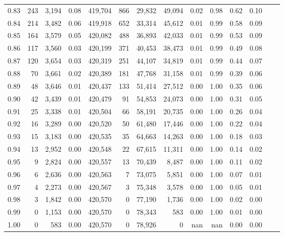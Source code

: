 \begin{tabular}{rrrrrrrrrrrrrr}
0.83 &    243 &  3,194 &     0.08 &  419,704 &      866 &  29,832 &  49,094 &  0.02 &  0.98 &  0.62 &      0.10 \\
0.84 &    214 &  3,482 &     0.06 &  419,918 &      652 &  33,314 &  45,612 &  0.01 &  0.99 &  0.58 &      0.09 \\
0.85 &    164 &  3,579 &     0.05 &  420,082 &      488 &  36,893 &  42,033 &  0.01 &  0.99 &  0.53 &      0.09 \\
0.86 &    117 &  3,560 &     0.03 &  420,199 &      371 &  40,453 &  38,473 &  0.01 &  0.99 &  0.49 &      0.08 \\
0.87 &    120 &  3,654 &     0.03 &  420,319 &      251 &  44,107 &  34,819 &  0.01 &  0.99 &  0.44 &      0.07 \\
0.88 &     70 &  3,661 &     0.02 &  420,389 &      181 &  47,768 &  31,158 &  0.01 &  0.99 &  0.39 &      0.06 \\
0.89 &     48 &  3,646 &     0.01 &  420,437 &      133 &  51,414 &  27,512 &  0.00 &  1.00 &  0.35 &      0.06 \\
0.90 &     42 &  3,439 &     0.01 &  420,479 &       91 &  54,853 &  24,073 &  0.00 &  1.00 &  0.31 &      0.05 \\
0.91 &     25 &  3,338 &     0.01 &  420,504 &       66 &  58,191 &  20,735 &  0.00 &  1.00 &  0.26 &      0.04 \\
0.92 &     16 &  3,289 &     0.00 &  420,520 &       50 &  61,480 &  17,446 &  0.00 &  1.00 &  0.22 &      0.04 \\
0.93 &     15 &  3,183 &     0.00 &  420,535 &       35 &  64,663 &  14,263 &  0.00 &  1.00 &  0.18 &      0.03 \\
0.94 &     13 &  2,952 &     0.00 &  420,548 &       22 &  67,615 &  11,311 &  0.00 &  1.00 &  0.14 &      0.02 \\
0.95 &      9 &  2,824 &     0.00 &  420,557 &       13 &  70,439 &   8,487 &  0.00 &  1.00 &  0.11 &      0.02 \\
0.96 &      6 &  2,636 &     0.00 &  420,563 &        7 &  73,075 &   5,851 &  0.00 &  1.00 &  0.07 &      0.01 \\
0.97 &      4 &  2,273 &     0.00 &  420,567 &        3 &  75,348 &   3,578 &  0.00 &  1.00 &  0.05 &      0.01 \\
0.98 &      3 &  1,842 &     0.00 &  420,570 &        0 &  77,190 &   1,736 &  0.00 &  1.00 &  0.02 &      0.00 \\
0.99 &      0 &  1,153 &     0.00 &  420,570 &        0 &  78,343 &     583 &  0.00 &  1.00 &  0.01 &      0.00 \\
1.00 &      0 &    583 &     0.00 &  420,570 &        0 &  78,926 &       0 &   nan &   nan &  0.00 &      0.00 \\
\bottomrule
\end{tabular}
